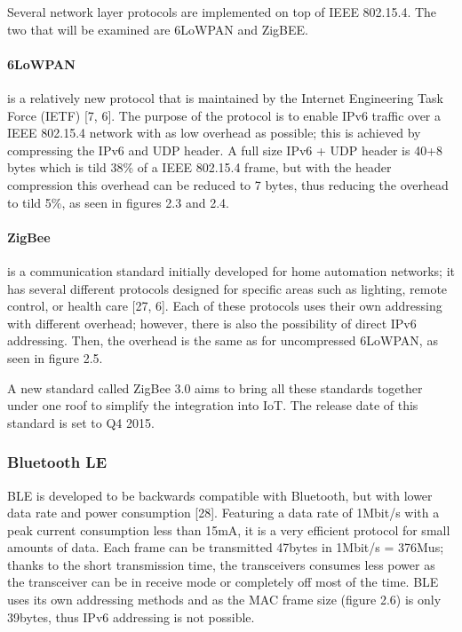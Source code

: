Several network layer protocols are implemented on top of IEEE 802.15.4.
The two that will be examined are 6LoWPAN and ZigBEE.

\paragraph{6LoWPAN} 
is a relatively new protocol that is maintained by the Internet
Engineering Task Force (IETF) [7, 6].
The purpose of the protocol is to enable IPv6 traffic over a IEEE 802.15.4 network with as low overhead as possible;
	this is achieved by compressing the IPv6 and UDP header.
A full size IPv6 + UDP header is 40+8 bytes which is tild 38\% of a IEEE 802.15.4
frame,
	but with the header compression this overhead can be reduced to 7 bytes,
	thus reducing the overhead to tild 5\%,
	as seen in figures 2.3 and 2.4.

\paragraph{ZigBee} 
is a communication standard initially developed for home automation
networks; it has several different protocols designed for specific areas such
as lighting, remote control, or health care [27, 6]. Each of these protocols
uses their own addressing with different overhead; however, there is also the
possibility of direct IPv6 addressing. Then, the overhead is the same as for
uncompressed 6LoWPAN, as seen in figure 2.5.

A new standard called ZigBee 3.0 aims to bring all these standards together under one roof to simplify the integration into IoT.
The release date of this standard is set to Q4 2015.

\subsubsection{Bluetooth LE}
BLE is developed to be backwards compatible with Bluetooth,
	but with lower data rate and power consumption [28].
Featuring a data rate of 1Mbit/s with a peak current consumption less than 15mA,
	it is a very efficient protocol for small amounts of data.
Each frame can be transmitted 47bytes in 1Mbit/s = 376Mus;
	thanks to the short transmission time,
	the transceivers consumes less power as the transceiver can be in receive mode or completely off most of the time.
BLE uses its own addressing methods and as the MAC frame size (figure 2.6) is only 39bytes,
	thus IPv6 addressing is not possible.


